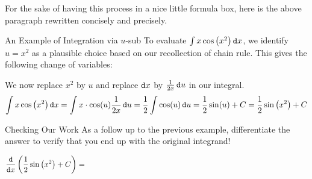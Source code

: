 For the sake of having this process in a nice little formula box, here is the above paragraph rewritten concisely and precisely.

\begin{example}{An Example of Integration via $u$-sub}\label{sup} To evaluate $ \int x \cos\left( x^2\right) \mathop{}\!\mathtt{d} x$, we identify $u=x^2$ as a plausible choice based on our recollection of chain rule.  This gives the following change of variables:

We now replace $x^2$ by $u$ and replace $\mathop{}\!\mathtt{d} x$ by $\frac{1}{2x}\mathop{}\!\mathtt{d} u$ in our integral.
$$ \int x \cos\left( x^2\right) \mathop{}\!\mathtt{d} x = \int x\cdot \cos(u) \frac{1}{2x}\mathop{}\!\mathtt{d} u =\frac{1}{2}\int \cos(u) \mathop{}\!\mathtt{d} u=\frac{1}{2}\sin(u)+C=\frac{1}{2}\sin\left(x^2\right)+C$$

\end{example}

\begin{exercise}{Checking Our Work \Coffeecup }
As a follow up to the previous example, differentiate the answer to verify that you end up with the original integrand!

$$\frac{\dif}{\dif x}\left(\frac{1}{2}\sin\left(x^2\right)+C\right)=\hspace{4in}$$

\end{exercise}

